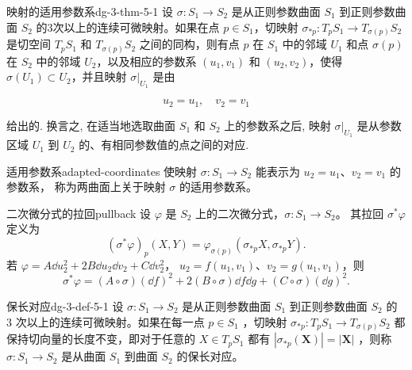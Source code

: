 \begin{theorem}{映射的适用参数系}{dg-3-thm-5-1}
设 \(\sigma: S_1 \to S_2\) 是从正则参数曲面 \(S_1\) 到正则参数曲面 \(S_2\) 的3次以上的连续可微映射。如果在点 \(p \in S_1\)，切映射 \(\sigma_{*p}: T_p S_1 \to T_{\sigma(p)} S_2\) 是切空间 \(T_p S_1\) 和 \(T_{\sigma(p)} S_2\) 之间的同构，则有点 \(p\) 在 \(S_1\) 中的邻域 \(U_1\) 和点 \(\sigma(p)\) 在 \(S_2\) 中的邻域 \(U_2\)，以及相应的参数系 \((u_1, v_1)\) 和 \((u_2, v_2)\)，使得 \(\sigma(U_1) \subset U_2\)，并且映射 \(\sigma|_{U_1}\) 是由\par

\begin{equation*}
u _ {2} = u _ {1}, \quad v _ {2} = v _ {1}
\end{equation*}

给出的. 换言之, 在适当地选取曲面 \(S_{1}\) 和 \(S_{2}\) 上的参数系之后, 映射 \(\sigma|_{U_1}\) 是从参数区域 \(U_{1}\) 到 \(U_{2}\) 的、有相同参数值的点之间的对应.
\end{theorem}

\begin{definition}{适用参数系}{adapted-coordinates}
使映射 $\sigma:S_1\to S_2$ 能表示为 $u_2=u_1$、$v_2=v_1$ 的参数系，
称为两曲面上关于映射 $\sigma$ 的适用参数系。
\end{definition}

\begin{definition}{二次微分式的拉回}{pullback}
设 $\varphi$ 是 $S_2$ 上的二次微分式，$\sigma:S_1\to S_2$。
其拉回 $\sigma^*\varphi$ 定义为
\[
(\sigma^*\varphi)_p(X,Y)
=\varphi_{\sigma(p)}(\sigma_{*p}X,\sigma_{*p}Y).
\]
若 $\varphi=A\dd u_2^2+2B\dd u_2\dd v_2+C\dd v_2^2$，
$u_2=f(u_1,v_1)$、$v_2=g(u_1,v_1)$，则
\[
\sigma^*\varphi=(A\circ\sigma)(\dd f)^2
+2(B\circ\sigma)\dd f\dd g+(C\circ\sigma)(\dd g)^2.
\]
\end{definition}

\begin{definition}{保长对应}{dg-3-def-5-1}
设  \(\sigma: S_{1} \rightarrow S_{2}\)  是从正则参数曲面  \(S_{1}\)  到正则参数曲面  \(S_{2}\)  的 3 次以上的连续可微映射。如果在每一点  \(p \in S_{1}\) ，切映射  \(\sigma_{*p}: T_{p}S_{1} \rightarrow T_{\sigma(p)}S_{2}\)  都保持切向量的长度不变，即对于任意的  \(X \in T_{p}S_{1}\)  都有  \(|\sigma_{*p}(\boldsymbol{X})| = |\boldsymbol{X}|\) ，则称  \(\sigma: S_{1} \rightarrow S_{2}\)  是从曲面  \(S_{1}\)  到曲面  \(S_{2}\)  的保长对应。
\end{definition}

